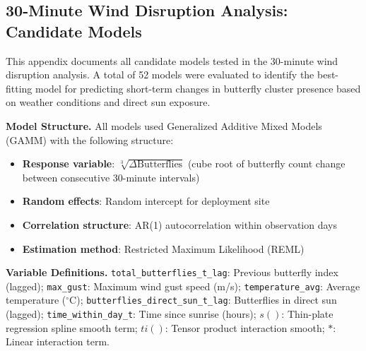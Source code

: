 \documentclass[insects,article,submit,pdftex,moreauthors]{Definitions/mdpi}
\begin{document}
\begin{appendix}

\section{30-Minute Wind Disruption Analysis: Candidate Models}
\label{app:30min_models}

This appendix documents all candidate models tested in the 30-minute wind disruption analysis. A total of 52 models were evaluated to identify the best-fitting model for predicting short-term changes in butterfly cluster presence based on weather conditions and direct sun exposure.

\textbf{Model Structure.}
All models used Generalized Additive Mixed Models (GAMM) with the following structure:
\begin{itemize}
\item \textbf{Response variable}: $\sqrt[3]{\Delta\text{Butterflies}}$ (cube root of butterfly count change between consecutive 30-minute intervals)
\item \textbf{Random effects}: Random intercept for deployment site
\item \textbf{Correlation structure}: AR(1) autocorrelation within observation days
\item \textbf{Estimation method}: Restricted Maximum Likelihood (REML)
\end{itemize}

\textbf{Variable Definitions.}
\texttt{total\_butterflies\_t\_lag}: Previous butterfly index (lagged);
\texttt{max\_gust}: Maximum wind gust speed (m/s);
\texttt{temperature\_avg}: Average temperature ($^{\circ}$C);
\texttt{butterflies\_direct\_sun\_t\_lag}: Butterflies in direct sun (lagged);
\texttt{time\_within\_day\_t}: Time since sunrise (hours);
$s()$: Thin-plate regression spline smooth term;
$ti()$: Tensor product interaction smooth;
$*$: Linear interaction term.


\end{appendix}
\end{document}
